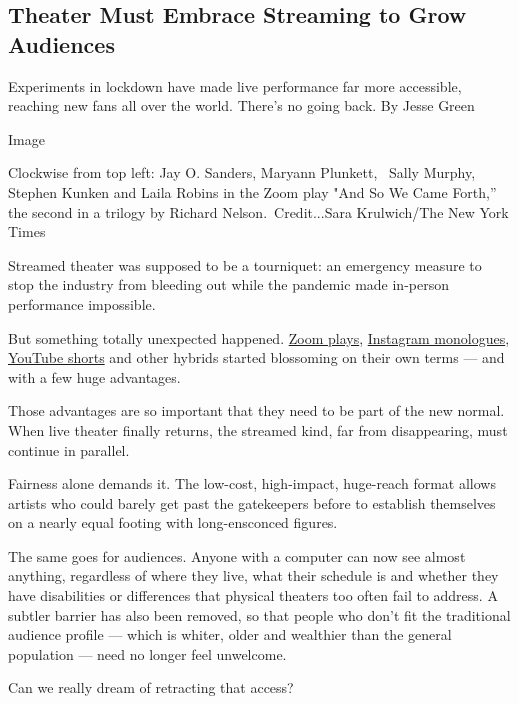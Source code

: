 \hypertarget{theater-must-embrace-streaming-to-grow-audiences}{%
\subsection{Theater Must Embrace Streaming to Grow
Audiences}\label{theater-must-embrace-streaming-to-grow-audiences}}

Experiments in lockdown have made live performance far more accessible,
reaching new fans all over the world. There's no going back. By Jesse
Green

Image

Clockwise from top left: Jay O. Sanders, Maryann Plunkett,~ Sally
Murphy, Stephen Kunken and Laila Robins in the Zoom play "And So We Came
Forth,'' the second in a trilogy by Richard Nelson.~Credit...Sara
Krulwich/The New York Times

Streamed theater was supposed to be a tourniquet: an emergency measure
to stop the industry from bleeding out while the pandemic made in-person
performance impossible.

But something totally unexpected happened.
\href{https://www.nytimes3xbfgragh.onion/2020/06/17/theater/review-state-vs-natasha-banina.html}{Zoom
plays},
\href{https://www.nytimes3xbfgragh.onion/2020/08/10/theater/review-weston-playhouse-one-room.html}{Instagram
monologues}, \href{https://www.youtube.com/watch?v=YeOqzQedwHE}{YouTube
shorts} and other hybrids started blossoming on their own terms --- and
with a few huge advantages.

Those advantages are so important that they need to be part of the new
normal. When live theater finally returns, the streamed kind, far from
disappearing, must continue in parallel.

Fairness alone demands it. The low-cost, high-impact, huge-reach format
allows artists who could barely get past the gatekeepers before to
establish themselves on a nearly equal footing with long-ensconced
figures.

The same goes for audiences. Anyone with a computer can now see almost
anything, regardless of where they live, what their schedule is and
whether they have disabilities or differences that physical theaters too
often fail to address. A subtler barrier has also been removed, so that
people who don't fit the traditional audience profile --- which is
whiter, older and wealthier than the general population --- need no
longer feel unwelcome.

Can we really dream of retracting that access?

